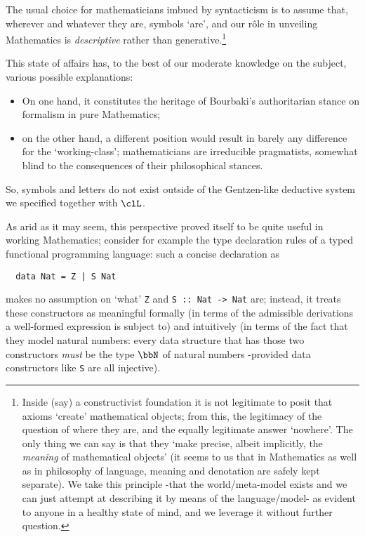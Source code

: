 The usual choice for mathematicians imbued by syntacticism is to assume that, wherever and whatever they are, symbols `are', and our r\^ole in unveiling Mathematics is \emph{descriptive} rather than generative.\footnote{Inside (say) a constructivist foundation it is not legitimate to posit that axioms `create' mathematical objects; from this, the legitimacy of the question of where they are, and the equally legitimate answer `nowhere'. The only thing we can say is that they `make precise, albeit implicitly, the \emph{meaning} of mathematical objects' \cite{Agzz} (it seems to us that in Mathematics as well as in philosophy of language, meaning and denotation are safely kept separate). We take this principle -that the world/meta\hyp{}model exists and we can just attempt at describing it by means of the language/model- as evident to anyone in a healthy state of mind, and we leverage it without further question.}

This state of affairs has, to the best of our moderate knowledge on the subject, various possible explanations:
\begin{itemize}
	\item On one hand, it constitutes the heritage of Bourbaki's authoritarian stance on formalism in pure Mathematics;
	\item on the other hand, a different position would result in barely any difference for the `working-class'; mathematicians are irreducible pragmatists, somewhat blind to the consequences of their philosophical stances.
\end{itemize}
So, symbols and letters do not exist outside of the Gentzen-like deductive system we specified together with $\clL$.

As arid as it may seem, this perspective proved itself to be quite useful in working Mathematics; consider for example the type declaration rules of a typed functional programming language: such a concise declaration as
\begin{verbatim}
  data Nat = Z | S Nat
\end{verbatim}
makes no assumption on `what' \texttt{Z} and \texttt{S :: Nat -> Nat} are; instead, it treats these constructors as meaningful formally (in terms of the admissible derivations a well-formed expression is subject to) and intuitively (in terms of the fact that they model natural numbers: every data structure that has those two constructors \emph{must} be the type $\bbN$ of natural numbers -provided data constructors like \verb|S| are all injective).

